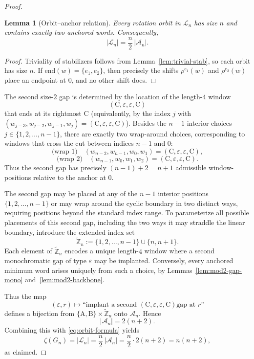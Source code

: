 \documentclass[11pt]{article}
\theoremstyle{plain}
\newtheorem{lemma}[theorem]{Lemma}
\theoremstyle{definition}
\theoremstyle{remark}
\newcommand{\ZZ}{\mathbb{Z}}
\newcommand{\colA}{\mathrm{A}}
\newcommand{\colB}{\mathrm{B}}
\newcommand{\colC}{\mathrm{C}}
\begin{document}
\begin{proof}
\begin{lemma}[Orbit--anchor relation]\label{lem:orbit-anchor}
Every rotation orbit in $\mathcal{L}_n$ has size $n$ and contains exactly two anchored
words.  Consequently,
\begin{equation}\label{eq:orbit-formula}
|\mathcal{L}_n|=\frac{n}{2}\,|\mathcal{A}_n|.
\end{equation}
\end{lemma}

\begin{proof}
Triviality of stabilizers follows from Lemma~\ref{lem:trivial-stab}, so each orbit has
size $n$.  If $\mathrm{end}(w)=\{e_1,e_2\}$, then precisely the shifts
$\rho^{e_1}(w)$ and $\rho^{e_2}(w)$ place an endpoint at $0$, and no other shift does.
\end{proof}

The second size-$2$ gap is determined by the location of the length-$4$ window
\[
(\colC,\varepsilon,\varepsilon,\colC)
\]
that ends at its rightmost $\colC$ (equivalently, by the index $j$ with
$(w_{j-3},w_{j-2},w_{j-1},w_j)=(\colC,\varepsilon,\varepsilon,\colC)$).
Besides the $n-1$ interior choices $j\in\{1,2,\dots,n-1\}$, there are exactly two
wrap-around choices, corresponding to windows that cross the cut between indices
$n-1$ and $0$:
\[
\text{(wrap 1)}\quad (w_{n-2},w_{n-1},w_0,w_1)=(\colC,\varepsilon,\varepsilon,\colC),
\]
\[
\text{(wrap 2)}\quad (w_{n-1},w_0,w_1,w_2)=(\colC,\varepsilon,\varepsilon,\colC).
\]
Thus the second gap has precisely $(n-1)+2=n+1$ admissible window-positions relative to
the anchor at $0$.

The second gap may be placed at any of the $n-1$ interior positions $\{1,2,\dots,n-1\}$
or may wrap around the cyclic boundary in two distinct ways, requiring positions beyond
the standard index range.
To parameterize all possible placements of this second gap, including the two ways it
may straddle the linear boundary, introduce the extended index set
\[
\widetilde{\ZZ}_n:=\{1,2,\dots,n-1\}\cup\{n,n+1\}.
\]
Each element of $\widetilde{\ZZ}_n$ encodes a unique length-$4$ window where a second
monochromatic gap of type $\varepsilon$ may be implanted.  Conversely, every anchored
minimum word arises uniquely from such a choice, by Lemmas~\ref{lem:mod2-gap-mono}
and~\ref{lem:mod2-backbone}.

Thus the map
\[
(\varepsilon,r)\longmapsto\text{``implant a second $(\colC,\varepsilon,\varepsilon,\colC)$
gap at $r$''}
\]
defines a bijection from $\{\colA,\colB\}\times\widetilde{\ZZ}_n$ onto $\mathcal{A}_n$.
Hence
\[
|\mathcal{A}_n|=2(n+2).
\]
Combining this with \eqref{eq:orbit-formula} yields
\[
\zeta(G_n)=|\mathcal{L}_n|
=\frac{n}{2}\,|\mathcal{A}_n|
=\frac{n}{2}\cdot 2(n+2)
=n(n+2),
\]
as claimed.
\end{proof}
\end{document}
